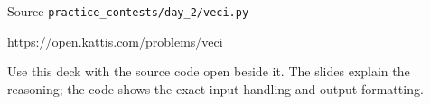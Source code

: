 \documentclass[aspectratio=169,11pt]{beamer}
\begin{document}
\begin{frame}{Source}
\small
{} \texttt{practice\_contests/day\_2/veci.py}

\vspace{0.3cm}
 \url{https://open.kattis.com/problems/veci}

\vspace{0.45cm}
Use this deck with the source code open beside it. The slides explain the reasoning; the code shows the exact input handling and output formatting.
\end{frame}
\end{document}
